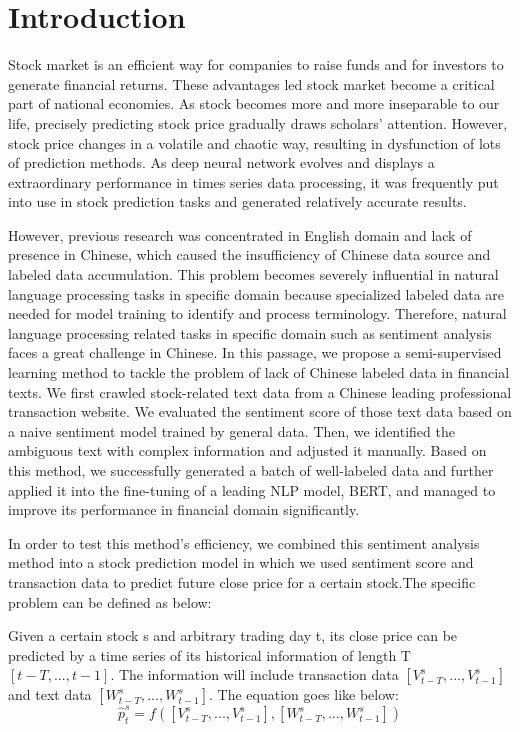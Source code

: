 \documentclass[runningheads]{llncs}
\begin{document}
\section{Introduction}
Stock market is an efficient way for companies to raise funds and for investors to generate financial returns. These advantages led stock market become a critical part of national economies. As stock becomes more and more inseparable to our life, precisely predicting stock price gradually draws scholars' attention. However, stock price changes in a volatile and chaotic way, resulting in dysfunction of lots of prediction methods. As deep neural network evolves and displays a extraordinary performance in times series data processing, it was frequently put into use in stock prediction tasks and generated relatively accurate results.

However, previous research was concentrated in English domain and lack of presence in Chinese, which caused the insufficiency of Chinese data source and labeled data accumulation. This problem becomes severely influential in natural language processing tasks in specific domain because specialized labeled data are needed for model training to identify and process terminology. Therefore, natural language processing related tasks in specific domain such as sentiment analysis faces a great challenge in Chinese.
In this passage, we propose a semi-supervised learning method to tackle the problem of lack of Chinese labeled data in financial texts. We first crawled stock-related text data from a Chinese leading professional transaction website. We evaluated the sentiment score of those text data based on a naive sentiment model trained by general data. Then, we identified the ambiguous text with complex information and adjusted it manually. Based on this method, we successfully generated a batch of well-labeled data and further applied it into the fine-tuning of a leading NLP model, BERT, and managed to improve its performance in financial domain significantly.

In order to test this method's efficiency, we combined this sentiment analysis method into a stock prediction model in which we used sentiment score and transaction data to predict future close price for a certain stock.The specific problem can be defined as below:

Given a certain stock s and arbitrary trading day t, its close price can be predicted by a time series of its historical information of length T $[t-T,...,t-1]$. The information will include transaction data $[V_{t-T}^s,...,V_{t-1}^s]$ and text data $[W_{t-T}^s,...,W_{t-1}^s]$. The equation goes like below:
\begin{equation}
\hat{p}_t^s = f([V_{t-T}^s, ..., V_{t-1}^s], [W_{t-T}^s,...,W_{t-1}^s])
\end{equation} 
\end{document}

